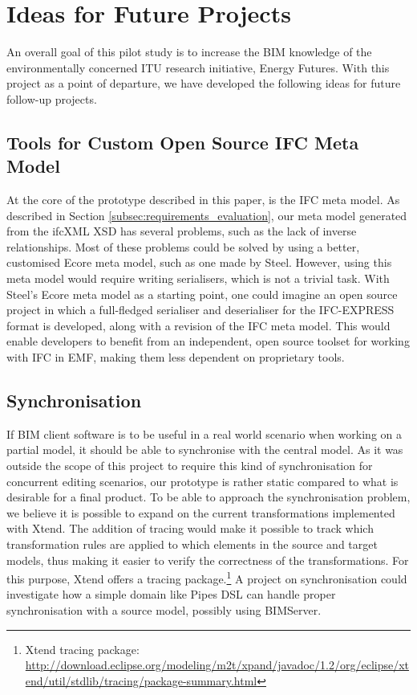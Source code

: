 
\section{Ideas for Future Projects}
\label{sec:plan_for_future_projects}
An overall goal of this pilot study is to increase the BIM knowledge of the environmentally concerned ITU research initiative, Energy Futures. With this project as a point of departure, we have developed the following ideas for future follow-up projects.

\subsection{Tools for Custom Open Source IFC Meta Model}
At the core of the prototype described in this paper, is the IFC meta model. As described in Section \ref{subsec:requirements_evaluation}, our meta model generated from the ifcXML XSD has several problems, such as the lack of inverse relationships. Most of these problems could be solved by using a better, customised Ecore meta model, such as one made by Steel. However, using this meta model would require writing serialisers, which is not a trivial task. With Steel's Ecore meta model as a starting point, one could imagine an open source project in which a full-fledged serialiser and deserialiser for the IFC-EXPRESS format is developed, along with a revision of the IFC meta model. This would enable developers to benefit from an independent, open source toolset for working with IFC in EMF, making them less dependent on proprietary tools.

\subsection{Synchronisation}
If BIM client software is to be useful in a real world scenario when working on a partial model, it should be able to synchronise with the central model. As it was outside the scope of this project to require this kind of synchronisation for concurrent editing scenarios, our prototype is rather static compared to what is desirable for a final product. To be able to approach the synchronisation problem, we believe it is possible to expand on the current transformations implemented with Xtend. The addition of tracing would make it possible to track which transformation rules are applied to which elements in the source and target models, thus making it easier to verify the correctness of the transformations. For this purpose, Xtend offers a tracing package.\footnote{Xtend tracing package: \url{http://download.eclipse.org/modeling/m2t/xpand/javadoc/1.2/org/eclipse/xtend/util/stdlib/tracing/package-summary.html}} A project on synchronisation could investigate how a simple domain like Pipes DSL can handle proper synchronisation with a source model, possibly using BIMServer.

